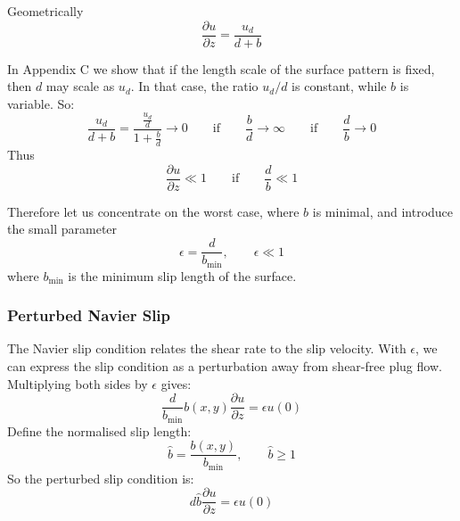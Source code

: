 \documentclass[12pt, a4paper, twoside, openright]{book}
\newcommand{\bmin}{\ensuremath{b_{\mathrm{min}}}}
\begin{document}
\begin{center}
\end{center}

Geometrically
\begin{equation}
\frac{\partial u}{\partial z} = \frac{u_d}{d+b} 
\end{equation}

In Appendix C we show that if the length scale of the surface pattern is fixed, then $d$ may scale as $u_d$.  In that case, the ratio $u_d/d$ is constant, while $b$ is variable. So:
\begin{equation}
\frac{u_d}{d+b} = \frac{\frac{u_d}{d}}{1 + \frac{b}{d}} \to 0 
\qquad \text{if} \qquad
\frac{b}{d} \to \infty
\qquad \text{if} \qquad
\frac{d}{b} \to 0
\end{equation}
Thus
\begin{equation}
\frac{\partial u}{\partial z} \ll 1 \qquad \text{if} \qquad\frac{d}{b} \ll 1
\end{equation}

Therefore let us concentrate on the worst case, where $b$ is minimal, and introduce the small parameter
\begin{equation}
\epsilon = \frac{d}{\bmin}, \qquad \epsilon \ll 1
\end{equation}
where $\bmin$ is the minimum slip length of the surface.

\subsubsection*{Perturbed Navier Slip}

The Navier slip condition relates the shear rate to the slip velocity.  With $\epsilon$, we can express the slip condition as a perturbation away from shear-free plug flow.  Multiplying both sides by $\epsilon$ gives:
\begin{equation}
\frac{d}{\bmin} b(x,y) \frac{\partial u }{\partial z} = \epsilon u(0)
\end{equation}
Define the normalised slip length:
\begin{equation}
\hat{b} = \frac{b(x,y)}{\bmin},   \qquad \hat{b} \geq 1
\end{equation}
So the perturbed slip condition is:
\begin{equation}
d \hat{b} \frac{\partial u}{\partial z} = \epsilon u(0)
\end{equation}
\end{document}
